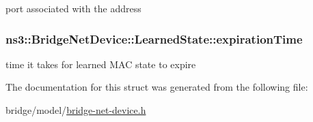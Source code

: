 port associated with the address 

\subsubsection[{\texorpdfstring{expiration\+Time}{expirationTime}}]{ ns3\+::\+Bridge\+Net\+Device\+::\+Learned\+State\+::expiration\+Time}\hypertarget{structns3_1_1BridgeNetDevice_1_1LearnedState_a2bb61bbc1795ebc69bd90bb5525829c1}{}\label{structns3_1_1BridgeNetDevice_1_1LearnedState_a2bb61bbc1795ebc69bd90bb5525829c1}


time it takes for learned M\+AC state to expire 



The documentation for this struct was generated from the following file\+:\begin{DoxyCompactItemize}
\item 
bridge/model/\hyperlink{bridge-net-device_8h}{bridge-\/net-\/device.\+h}\end{DoxyCompactItemize}
